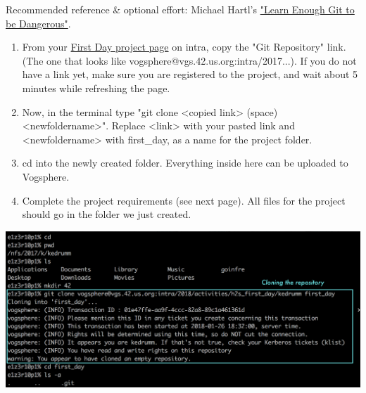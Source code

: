 \documentclass{42-en}
\begin{document}
Recommended reference \& optional effort: Michael Hartl's \href{https://www.learnenough.com/git-tutorial}{"Learn Enough Git to be Dangerous"}.

\begin{enumerate}

\item From your \href{https://projects.intra.42.fr/h2s-first-day/mine}{First Day project page} on intra, copy the "Git Repository" link. (The one that looks like vogsphere@vgs.42.us.org:intra/2017...). If you do not have a link yet, make sure you are registered to the project, and wait about 5 minutes while refreshing the page.

\item Now, in the terminal type "git clone <copied link> (space) <newfoldername>". Replace <link> with your pasted link and <newfoldername> with first\_day, as a name for the project folder.

\item cd into the newly created folder. Everything inside here can be uploaded to Vogsphere.

\item Complete the project requirements (see next page). All files for the project should go in the folder we just created.

\end{enumerate}

\includegraphics[width=1\textwidth]{screenshots/clone_first_day}


\end{document}
